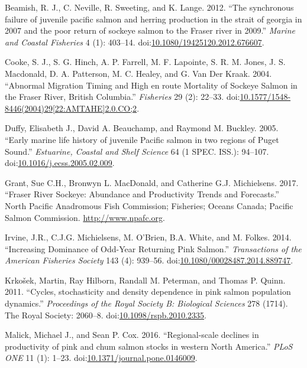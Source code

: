 \documentclass[fleqn,10pt]{wlpeerj} %
\begin{document}
\hypertarget{ref-Beamish2012}{}
Beamish, R. J., C. Neville, R. Sweeting, and K. Lange. 2012. ``The
synchronous failure of juvenile pacific salmon and herring production in
the strait of georgia in 2007 and the poor return of sockeye salmon to
the Fraser river in 2009.'' \emph{Marine and Coastal Fisheries} 4 (1):
403--14.
doi:\href{https://doi.org/10.1080/19425120.2012.676607}{10.1080/19425120.2012.676607}.

\hypertarget{ref-Cooke2004}{}
Cooke, S. J., S. G. Hinch, A. P. Farrell, M. F. Lapointe, S. R. M.
Jones, J. S. Macdonald, D. A. Patterson, M. C. Healey, and G. Van Der
Kraak. 2004. ``Abnormal Migration Timing and High en route Mortality of
Sockeye Salmon in the Fraser River, British Columbia.'' \emph{Fisheries}
29 (2): 22--33.
doi:\href{https://doi.org/10.1577/1548-8446(2004)29\%5B22:AMTAHE\%5D2.0.CO;2}{10.1577/1548-8446(2004)29{[}22:AMTAHE{]}2.0.CO;2}.

\hypertarget{ref-Duffy2005}{}
Duffy, Elisabeth J., David A. Beauchamp, and Raymond M. Buckley. 2005.
``Early marine life history of juvenile Pacific salmon in two regions of
Puget Sound.'' \emph{Estuarine, Coastal and Shelf Science} 64 (1 SPEC.
ISS.): 94--107.
doi:\href{https://doi.org/10.1016/j.ecss.2005.02.009}{10.1016/j.ecss.2005.02.009}.

\hypertarget{ref-Grant2017}{}
Grant, Sue C.H., Bronwyn L. MacDonald, and Catherine G.J. Michielsens.
2017. ``Fraser River Sockeye: Abundance and Productivity Trends and
Forecasts.'' North Pacific Anadromous Fish Commission; Fisheries; Oceans
Canada; Pacific Salmon Commission. \url{http://www.npafc.org}.

\hypertarget{ref-Irvine2014}{}
Irvine, J.R., C.J.G. Michielsens, M. O'Brien, B.A. White, and M. Folkes.
2014. ``Increasing Dominance of Odd-Year Returning Pink Salmon.''
\emph{Transactions of the American Fisheries Society} 143 (4): 939--56.
doi:\href{https://doi.org/10.1080/00028487.2014.889747}{10.1080/00028487.2014.889747}.

\hypertarget{ref-Krkosek2011}{}
Krkošek, Martin, Ray Hilborn, Randall M. Peterman, and Thomas P. Quinn.
2011. ``Cycles, stochasticity and density dependence in pink salmon
population dynamics.'' \emph{Proceedings of the Royal Society B:
Biological Sciences} 278 (1714). The Royal Society: 2060--8.
doi:\href{https://doi.org/10.1098/rspb.2010.2335}{10.1098/rspb.2010.2335}.

\hypertarget{ref-Malick2016}{}
Malick, Michael J., and Sean P. Cox. 2016. ``Regional-scale declines in
productivity of pink and chum salmon stocks in western North America.''
\emph{PLoS ONE} 11 (1): 1--23.
doi:\href{https://doi.org/10.1371/journal.pone.0146009}{10.1371/journal.pone.0146009}.
\end{document}
